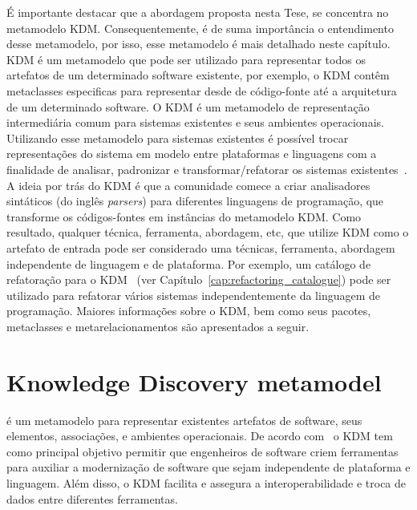 É importante destacar que a abordagem proposta nesta Tese, se concentra no metamodelo KDM. Consequentemente, é de suma importância o entendimento desse metamodelo, por isso, esse metamodelo é mais detalhado neste capítulo.
KDM é um metamodelo que pode ser utilizado para representar todos os artefatos de um determinado software existente, por exemplo, o KDM contêm metaclasses especificas para representar desde de código-fonte até a arquitetura de um determinado software. O KDM é um metamodelo de representação intermediária comum para sistemas existentes e seus ambientes operacionais. Utilizando esse metamodelo para sistemas existentes é possível trocar representações do sistema em modelo entre plataformas e linguagens com a finalidade de analisar, padronizar e transformar/refatorar os sistemas existentes~\cite{ADM:OMG}. A ideia por trás do KDM é que a comunidade comece a criar analisadores sintáticos (do inglês \textit{parsers}) para diferentes linguagens de programação, que transforme os códigos-fontes em instâncias do metamodelo KDM. Como resultado, qualquer técnica, ferramenta, abordagem, etc, que utilize KDM como o artefato de entrada pode ser considerado uma técnicas, ferramenta, abordagem independente de linguagem e de plataforma. Por exemplo, um catálogo de refatoração para o KDM~\cite{durelli_catalogo, durelli_VEM_ferramenta} (ver Capítulo~\ref{cap:refactoring_catalogue}) pode ser utilizado para refatorar vários sistemas independentemente da linguagem de programação. Maiores informações sobre o KDM, bem como seus pacotes, metaclasses e metarelacionamentos são apresentados a seguir.

\section{Knowledge Discovery metamodel}
\label{sec:knowledge_discovery_meta_model}

 é um metamodelo para representar existentes artefatos de software, seus elementos, associações, e ambientes operacionais. De acordo com~\cite{KDM:specification, PerezCastillo:2011jo, ADMCHAPTERR} o KDM tem como principal objetivo permitir que engenheiros de software criem ferramentas para auxiliar a modernização de software que sejam independente de plataforma e linguagem. Além disso, o KDM facilita e assegura a interoperabilidade e troca de dados entre diferentes ferramentas. 

